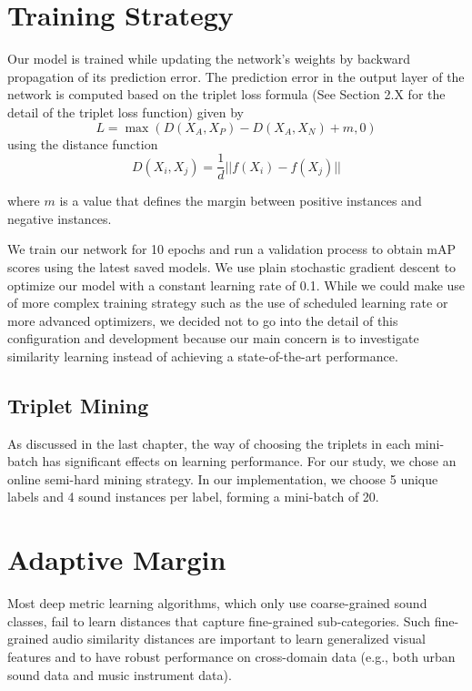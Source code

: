 \section{Training Strategy}
Our model is trained while updating the network's weights by backward propagation of its prediction error. The prediction error in the output layer of the network is computed based on the triplet loss formula (See Section 2.X for the detail of the triplet loss function) given by
\begin{equation}
    L = \max(D(X_A, X_P) - D (X_A, X_N ) + m, 0) 
\end{equation}
using the distance function
\begin{equation}
    D(X_i, X_j) = \frac{1}{d} || f(X_i) - f(X_j)||
\end{equation}

where $m$ is a value that defines the margin between positive instances and negative instances.

We train our network for 10 epochs and run a validation process to obtain mAP scores using the latest saved models. We use plain stochastic gradient descent to optimize our model with a constant learning rate of 0.1. While we could make use of more complex training strategy such as the use of scheduled learning rate or more advanced optimizers, we decided not to go into the detail of this configuration and development because our main concern is to investigate similarity learning instead of achieving a state-of-the-art performance.

\subsection{Triplet Mining}
As discussed in the last chapter, the way of choosing the triplets in each mini-batch has significant effects on learning performance. For our study, we chose an online semi-hard mining strategy. In our implementation, we choose 5 unique labels and 4 sound instances per label, forming a mini-batch of 20.

\newpage

\section{Adaptive Margin}
Most deep metric learning algorithms, which only use coarse-grained sound classes, fail to learn distances that capture fine-grained sub-categories. Such fine-grained audio similarity distances are important to learn generalized visual features and to have robust performance on cross-domain data (e.g., both urban sound data and music instrument data).

